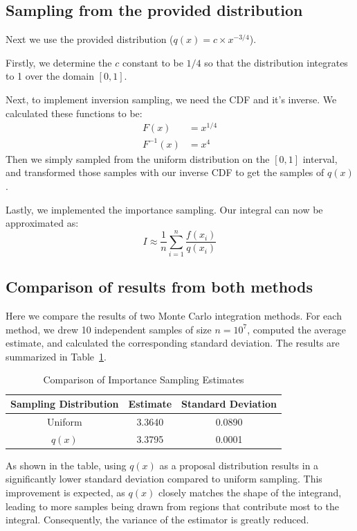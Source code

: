 \documentclass[9pt]{IEEEtran}
\begin{document}
 \subsection{Sampling from the provided distribution}
 Next we use the provided distribution ($q(x) = c \times x^{-3/4}$).
 
 Firstly, we determine the $c$ constant to be $1/4$ so that the distribution
  integrates to 1 over the domain $[0, 1]$. 

 Next, to implement inversion sampling, we need the CDF and it's inverse. 
 We calculated these functions to be: 
\begin{align*}
F(x) &= x^{1/4} \\
F^{-1}(x) &= x^4
\end{align*}
Then we simply sampled from the uniform distribution on the $[0, 1]$ interval, 
and transformed those samples with our inverse CDF to get the samples of $q(x)$.

Lastly, we implemented the importance sampling. Our integral can now be approximated as:
\[
I \approx \frac{1}{n} \sum_{i=1}^{n} \frac{f(x_i)}{ q(x_i)}
\] 


 \subsection{Comparison of results from both methods}
Here we compare the results of two Monte Carlo integration methods. For each method, we drew 10 independent 
samples of size $n = 10^7$, computed the average estimate, and calculated the corresponding
 standard deviation. The results are summarized in Table~\ref{tab:imp}.  

\begin{table}[h]
    \centering
    \begin{tabular}{c|c|c}

    \textbf{Sampling Distribution} & \textbf{Estimate} & \textbf{Standard Deviation} \\
    \hline
    Uniform  & 3.3640 & 0.0890 \\
    $q(x)$ & 3.3795 & 0.0001 \\
    \end{tabular}
    \caption{Comparison of Importance Sampling Estimates}
    \label{tab:imp}
\end{table}

As shown in the table, using $q(x)$ as a proposal distribution results in a significantly 
lower standard deviation compared to uniform sampling. This improvement is expected, as
$q(x)$ closely matches the shape of the integrand, leading to more samples being drawn
 from regions that contribute most to the integral. Consequently, the variance of the 
 estimator is greatly reduced.
\end{document}
